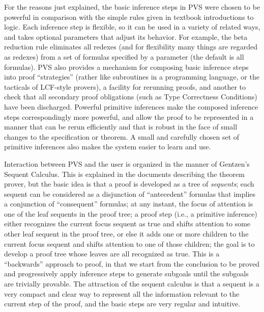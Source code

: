 {For the reasons just explained, the basic inference steps in PVS were
chosen to be powerful in comparison with the simple rules given in
textbook introductions to logic.  Each inference step is flexible, so
it can be used in a variety of related ways, and takes optional
parameters that adjust its behavior.  For example, the beta reduction
rule eliminates all redexes (and for flexibility many things are
regarded as redexes) from a set of formulas specified by a parameter
(the default is all formulas).  PVS also provides a mechanism for
composing basic inference steps into proof ``strategies'' (rather
like subroutines in a programming language, or the tacticals of
LCF-style provers), a facility for rerunning proofs, and another to
check that all secondary proof obligations (such as Type Correctness
Conditions) have been discharged.  Powerful primitive inferences make
the composed inference steps correspondingly more powerful, and allow
the proof to be represented in a manner that can be rerun efficiently
and that is robust in the face of small changes to the specification
or theorem.  A small and carefully chosen set of primitive inferences
also makes the system easier to learn and use.

Interaction between PVS and the user is organized in the manner of
Gentzen's Sequent Calculus.  This is explained in the documents
describing the theorem prover, but the basic idea is that a proof is
developed as a tree of {\em sequents\/}; each sequent can be
considered as a disjunction of ``antecedent'' formulas that implies a
conjunction of ``consequent'' formulas; at any instant, the focus of
attention is one of the leaf sequents in the proof tree; a proof step
(i.e., a primitive inference) either recognizes the current focus
sequent as true and shifts attention to some other leaf sequent in
the proof tree, or else it adds one or more children to the current
focus sequent and shifts attention to one of those children; the goal
is to develop a proof tree whose leaves are all recognized as true.
This is a ``backwards'' approach to proof, in that we start from the
conclusion to be proved and progressively apply inference steps to
generate subgoals until the subgoals are trivially provable.  The
attraction of the sequent calculus is that a sequent is a
very compact and clear way to represent all the information relevant
to the current step of the proof, and the basic steps are very
regular and intuitive.

}
